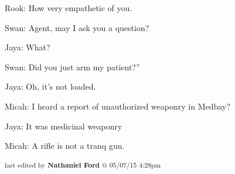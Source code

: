 Rook: How very empathetic of you.



Swan: Agent, may I ask you a question?

Jaya: What?

Swan: Did you just arm my patient?''

Jaya: Oh, it's not loaded.



Micah: I heard a report of unauthorized weaponry in Medbay?

Jaya: It was medicinal weaponry

Micah: A rifle is not a tranq gun.




\vspace{\fill}

\begin{flushright}
\textsubscript{last edited by \textbf{Nathaniel Ford} @ 05/07/15 4:28pm}
\end{flushright}

